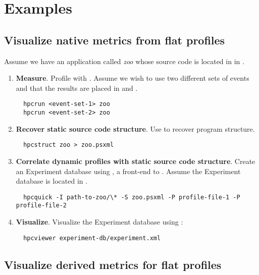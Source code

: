 \documentclass[english]{article}
\begin{document}
\section{Examples}

\subsection{Visualize native metrics from flat profiles}

Assume we have an application called \emph{zoo} whose source code is located in in .

\begin{enumerate}
\item \textbf{Measure}.  Profile with .  Assume we wish to use two different sets of events and that the results are placed in  and .
\begin{verbatim}
  hpcrun <event-set-1> zoo
  hpcrun <event-set-2> zoo
\end{verbatim}

\item \textbf{Recover static source code structure}. Use  to recover program structure.
\begin{verbatim}
  hpcstruct zoo > zoo.psxml
\end{verbatim}

\item \textbf{Correlate dynamic profiles with static source code structure}.
Create an Experiment database using , a front-end to .  Assume the Experiment database is located in .
\begin{verbatim}
  hpcquick -I path-to-zoo/\* -S zoo.psxml -P profile-file-1 -P profile-file-2
\end{verbatim}

\item \textbf{Visualize}.
Visualize the Experiment database using :
\begin{verbatim}
  hpcviewer experiment-db/experiment.xml
\end{verbatim}

\end{enumerate}

\subsection{Visualize derived metrics for flat profiles}
\end{document}
